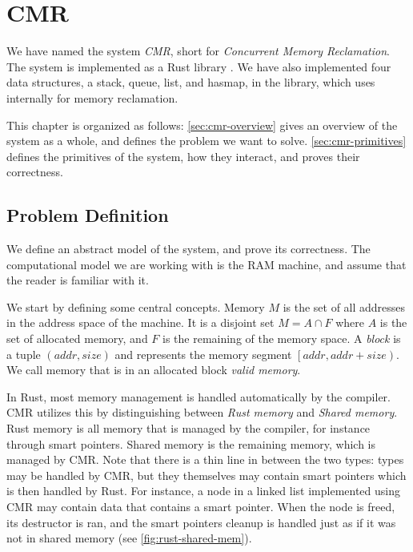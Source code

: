 \chapter{CMR\label{ch:cmr}}

We have named the system \emph{CMR}, short for \emph{Concurrent Memory Reclamation}. The system is
implemented as a Rust library . We have also implemented four data structures, a stack,
queue, list, and hasmap, in the  library, which uses 
internally for memory reclamation.

This chapter is organized as follows:
\cref{sec:cmr-overview} gives an overview of the system as a whole, and defines the problem
we want to solve.
\cref{sec:cmr-primitives} defines the primitives of the system, how they interact, and
proves their correctness.

\section{Problem Definition}

We define an abstract model of the system, and prove its correctness.
The computational model we are working with is the RAM machine, and assume
that the reader is familiar with it.

We start by defining some central concepts.
Memory $M$ is the set of all addresses in the address space of the machine.
It is a disjoint set $M = A \cap F$ where $A$ is the set of allocated memory, and $F$ is the
remaining of the memory space.
A \emph{block} is a tuple $(addr, size)$ and represents the memory segment $\left[addr, addr +
size\right)$.
We call memory that is in an allocated block \emph{valid memory}.

In Rust, most memory management is handled automatically by the compiler. CMR utilizes this by
distinguishing between \emph{Rust memory} and \emph{Shared memory}. Rust memory is all memory that
is managed by the compiler, for instance through smart pointers. Shared memory is the remaining
memory, which is managed by CMR\@. Note that there is a thin line in between the two types: types may
be handled by CMR, but they themselves may contain smart pointers which is then handled by Rust.
For instance, a node in a linked list implemented using CMR may contain data that contains a smart
pointer. When the node is freed, its destructor is ran, and the smart pointers cleanup is handled
just as if it was not in shared memory (see \cref{fig:rust-shared-mem}).

